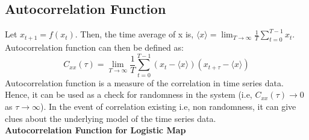 \documentclass[11pt]{article}
\begin{document}
            \subsection{Autocorrelation Function}
            Let $x_{t+1} = f(x_t)$. Then, the time average of x is, $\langle x \rangle = \lim_{T\to\infty}\frac{1}{T}\sum_{t=0}^{T-1}x_t$. Autocorrelation function can then be defined as:
            $$
               C_{xx}(\tau) = \lim_{T\to\infty}\frac{1}{T} \sum_{t=0}^{T-1}(x_t - \langle x\rangle)(x_{t+\tau} - \langle x\rangle)
            $$
            Autocorrelation function is a measure of the correlation in time series data. Hence, it can be used as a check for randomness in the system (i.e, $C_{xx}(\tau) \to 0$ as $\tau \to \infty$). In the event of correlation existing i.e, non randomness, it can give clues about the underlying model of the time series data.\\[5mm]
            \textbf{Autocorrelation Function for Logistic Map}
\end{document}
